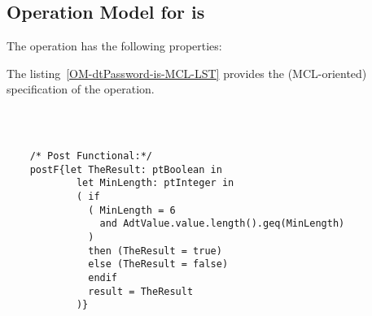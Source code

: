 \subsection{Operation Model for is}

\label{OM-is}


The  operation has the following properties:

	\begin{operationmodel}



		


	\end{operationmodel}



	\vspace{1cm}
	The listing~\ref{OM-dtPassword-is-MCL-LST} provides the \msrmessir (MCL-oriented) specification of the operation.
	
	\scriptsize
	\vspace{0.5cm}
	\begin{lstlisting}[style=MessirStyle,firstnumber=auto,captionpos=b,caption={\msrmessir (MCL-oriented) specification of the operation \emph{is}.},label=OM-dtPassword-is-MCL-LST]

	
	
	/* Post Functional:*/ 
	postF{let TheResult: ptBoolean in
	        let MinLength: ptInteger in
	        ( if
	          ( MinLength = 6
	            and AdtValue.value.length().geq(MinLength)
	          )
	          then (TheResult = true)
	          else (TheResult = false)
	          endif
	          result = TheResult
	        )}
	
	
	\end{lstlisting}
	\normalsize 
	
	
	
	





